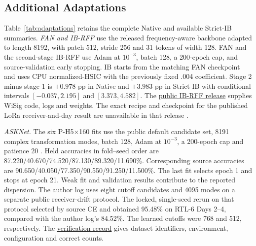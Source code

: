 \documentclass[journal]{IEEEtran}
\begin{document}
\subsection{Additional Adaptations}
Table~\ref{tab:adaptations} retains the complete Native and available Strict-IB summaries. \textit{FAN and IB-RFF} use the released frequency-aware backbone adapted to length 8192, with patch 512, stride 256 and 31 tokens of width 128. FAN and the second-stage IB-RFF use Adam at \(10^{-3}\), batch 128, a 200-epoch cap, and source-validation early stopping. IB starts from the matching FAN checkpoint and uses CPU normalized-HSIC with the previously fixed .004 coefficient. Stage 2 minus stage 1 is \(+0.978\) pp in Native and \(+3.983\) pp in Strict-IB with conditional intervals \([-0.037,2.195]\) and \([3.373,4.582]\). The \href{https://github.com/BeechburgPieStar/IB-RFF/tree/5a03a04da86c4bbf5cf90f41a55c268bf2152203}{public IB-RFF release} supplies WiSig code, logs and weights. The exact recipe and checkpoint for the published LoRa receiver-and-day result are unavailable in that release \cite{wang2026ib}.

\begin{table}[!t]\centering
\caption{Additional P-H5\(\times\)160 adaptations. Accuracies, F1 and worst-RX means are percentages. The \(\pm\) terms are sample fit SDs in pp.}
\label{tab:adaptations}
\end{table}

\textit{ASKNet.} The six P-H5\(\times\)160 fits use the public default candidate set, 8191 complex transformation modes, batch 128, Adam at \(10^{-3}\), a 200-epoch cap and patience 20 \cite{liu2026ask}. Held accuracies in fold--seed order are 87.220/40.670/74.520/87.130/89.320/11.690\%. Corresponding source accuracies are 90.650/40.050/77.350/90.550/91.250/11.500\%. The last fit selects epoch 1 and stops at epoch 21. Weak fit and validation results contribute to the reported dispersion. The \href{https://github.com/BeechburgPieStar/ASKNet-RFF/blob/f00846d68425315b68ae69b8c6b712e08559c2fe/Lora/logs/h5_rescisnet_k10_per800_trainrxn210_1_day1_seed2023.k_trace.txt}{author log} uses eight cutoff candidates and 4095 modes on a separate public receiver-drift protocol. The locked, single-seed rerun on that protocol selected by source CE and obtained 95.48\% on RTL-6 Days 2--4, compared with the author log's 84.52\%. The learned cutoffs were 768 and 512, respectively. The \href{https://github.com/hanCChan/crossatten/blob/59c44e1/research/s44_baseline_verification/RESULTS.zh-CN.md}{verification record} gives dataset identifiers, environment, configuration and correct counts.
\end{document}
